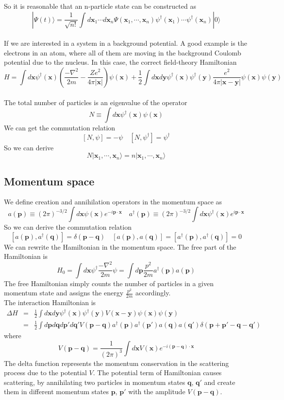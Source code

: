 So it is reasonable that  an n-particle state can be constructed as
\[|\Psi(t)\rangle = \frac{1}{\sqrt{n!}} \int d\bm{x}_1 \cdots d\bm{x}_n \Psi(\bm{x}_1,\cdots,\bm{x}_n) \psi^{\dagger}(\bm{x}_1)\cdots\psi^{\dagger}(\bm{x}_n)|0\rangle\]
\\
If we are interested in a system in a background potential.  
A good example is the electrons in an atom, where all of them are moving in the background Coulomb potential due to the nucleus. In this case, the correct field-theory Hamiltonian
\[H = \int d\bm{x} \psi^{\dagger}(\bm{x}) \left(\frac{-\nabla^2}{2m} - \frac{Ze^2}{4\pi |\bm{x}|} \right)\psi(\bm{x}) + \frac{1}{2}\int d\bm{x} d\bm{y} \psi^{\dagger}(\bm{x}) \psi^{\dagger}(\bm{y}) \frac{e^2}{4\pi|\bm{x}-\bm{y}|} \psi(\bm{x})\psi(\bm{y})\]
\\
The total number of particles is an eigenvalue of the operator
\[N \equiv \int d\bm{x} \psi^{\dagger}(\bm{x})\psi(\bm{x})\]
We can get the commutation relation
\[[N,\psi] = -\psi \quad [N,\psi^{\dagger}] = \psi^{\dagger}\]
So we can derive
\[N|\bm{x}_1,\cdots,\bm{x}_n\rangle = n|\bm{x}_1,\cdots,\bm{x}_n\rangle\]

\subsection{Momentum space}
We define creation and annihilation operators in the
momentum space as
\[a(\bm{p}) \equiv (2\pi)^{-3/2}\int d\bm{x} \psi(\bm{x}) e^{-i\bm{p}\cdot\bm{x}} \quad a^{\dagger}(\bm{p}) \equiv  (2\pi)^{-3/2} \int d\bm{x} \psi^{\dagger}(\bm{x}) e^{i\bm{p}\cdot\bm{x}}\]
So we can derive the commutation relation
\[[a(\bm{p}),a^{\dagger}(\bm{q})] = \delta(\bm{p}-\bm{q}) \quad [a(\bm{p}),a(\bm{q})] = [a^{\dagger}(\bm{p}),a^{\dagger}(\bm{q})] = 0\]
We can rewrite the Hamiltonian in the momentum space. The
free part of the Hamiltonian is
\[H_0 = \int d\bm{x} \psi^{\dagger} \frac{-\nabla^2}{2m} \psi = \int d\bm{p} \frac{p^2}{2m} a^{\dagger}(\bm{p})a(\bm{p})\]
The free Hamiltonian simply counts the number of particles in a given momentum state and assigns the energy $\frac{p^2}{2m}$ accordingly. \\
The interaction Hamiltonian is
\begin{eqnarray}
\Delta H &=& \frac{1}{2}\int d\bm{x} d\bm{y} \psi^{\dagger}(\bm{x}) \psi^{\dagger}(\bm{y}) V(\bm{x} - \bm{y}) \psi(\bm{x})\psi(\bm{y})  \nonumber \\
&=& \frac{1}{2} \int d\bm{p}d\bm{q}d\bm{p}'d\bm{q}' V(\bm{p}-\bm{q}) a^{\dagger}(\bm{p}) a^{\dagger}(\bm{p}') a(\bm{q}) a(\bm{q}') \delta(\bm{p}+\bm{p}'-\bm{q}-\bm{q}')\nonumber
\end{eqnarray}
where
\[V(\bm{p}-\bm{q}) = \frac{1}{(2\pi)^3} \int d\bm{x} V(\bm{x}) e^{-i(\bm{p}-\bm{q})\cdot\bm{x}}\]
The delta function represents the momentum conservation in the scattering process due to the potential $V$. The potential term of Hamiltonian causes scattering, by annihilating two particles in momentum states $\bm{q}$, $\bm{q}'$ and create them in different momentum states $\bm{p}$, $\bm{p}'$ with the amplitude
$V(\bm{p}-\bm{q})$.


